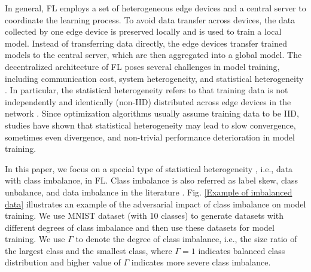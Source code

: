 \documentclass[10pt,journal,compsoc]{IEEEtran}
\begin{document}
In general, FL employs a set of heterogeneous edge devices and a central server to coordinate the learning process. To avoid data transfer across devices, the data collected by one edge device is preserved locally and is used to train a local model. Instead of transferring data directly, the edge devices transfer trained models to the central server, which are then aggregated into a global model. The decentralized architecture of FL poses several challenges in model training, including communication cost, system heterogeneity, and statistical heterogeneity \cite{li2020federated}. In particular, the statistical heterogeneity refers to that training data is not independently and identically (non-IID) distributed across edge devices in the network \cite{li2021survey} \cite{truex2019hybrid}. Since optimization algorithms usually assume training data to be IID, studies have shown that statistical heterogeneity may lead to slow convergence, sometimes even divergence, and non-trivial performance deterioration in model training.

In this paper, we focus on a special type of statistical heterogeneity \cite{li2021fedrs}, i.e., data with class imbalance, in FL. Class imbalance is also referred as label skew, class unbalance, and data imbalance in the literature \cite{tarekegn2021review} \cite{branco2016survey} \cite{kaur2019systematic} \cite{haixiang2017learning} \cite{krawczyk2016learning}. Fig. \ref{Example of imbalanced data} illustrates an example of the adversarial impact of class imbalance on model training. We use MNIST dataset (with 10 classes) to generate datasets with different degrees of class imbalance and then use these datasets for model training. We use $\Gamma$ to denote the degree of class imbalance, i.e., the size ratio of the largest class and the smallest class, where $\Gamma=1$ indicates balanced class distribution and higher value of $\Gamma$ indicates more severe class imbalance. 
\end{document}
